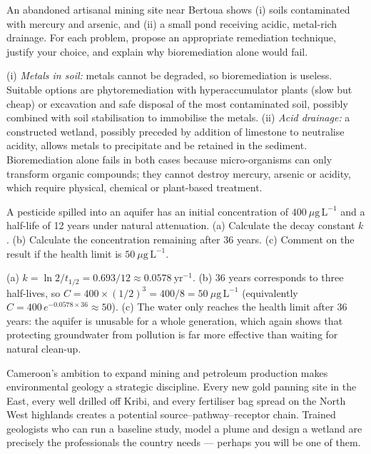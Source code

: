 \documentclass[11pt]{article}
\begin{document}
\begin{exercice}
An abandoned artisanal mining site near Bertoua shows (i) soils contaminated with mercury and arsenic, and (ii) a small pond receiving acidic, metal-rich drainage. For each problem, propose an appropriate remediation technique, justify your choice, and explain why bioremediation alone would fail.
\end{exercice}

\begin{corrige}[Exercise 1]
(i) \emph{Metals in soil:} metals cannot be degraded, so bioremediation is useless. Suitable options are phytoremediation with hyperaccumulator plants (slow but cheap) or excavation and safe disposal of the most contaminated soil, possibly combined with soil stabilisation to immobilise the metals. (ii) \emph{Acid drainage:} a constructed wetland, possibly preceded by addition of limestone to neutralise acidity, allows metals to precipitate and be retained in the sediment. Bioremediation alone fails in both cases because micro-organisms can only transform organic compounds; they cannot destroy mercury, arsenic or acidity, which require physical, chemical or plant-based treatment.
\end{corrige}

\begin{exercice}
A pesticide spilled into an aquifer has an initial concentration of $400\ \mu\mathrm{g\,L^{-1}}$ and a half-life of 12 years under natural attenuation. (a) Calculate the decay constant $k$. (b) Calculate the concentration remaining after 36 years. (c) Comment on the result if the health limit is $50\ \mu\mathrm{g\,L^{-1}}$.
\end{exercice}

\begin{corrige}[Exercise 2]
(a) $k = \ln 2 / t_{1/2} = 0.693 / 12 \approx 0.0578\ \mathrm{yr^{-1}}$. (b) 36 years corresponds to three half-lives, so $C = 400 \times (1/2)^3 = 400/8 = 50\ \mu\mathrm{g\,L^{-1}}$ (equivalently $C = 400\,e^{-0.0578 \times 36} \approx 50$). (c) The water only reaches the health limit after 36 years: the aquifer is unusable for a whole generation, which again shows that protecting groundwater from pollution is far more effective than waiting for natural clean-up.
\end{corrige}

\begin{savaistu}
Cameroon's ambition to expand mining and petroleum production makes environmental geology a strategic discipline. Every new gold panning site in the East, every well drilled off Kribi, and every fertiliser bag spread on the North West highlands creates a potential source–pathway–receptor chain. Trained geologists who can run a baseline study, model a plume and design a wetland are precisely the professionals the country needs — perhaps you will be one of them.
\end{savaistu}
\end{document}
